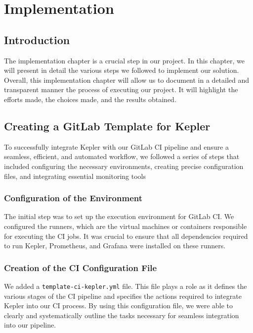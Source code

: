 \chapter{Implementation}
\label{chap:Chapter 4 title}
\section{Introduction}

The implementation chapter is a crucial step in our project. In this chapter, we will present in detail the various steps we followed to implement our solution. Overall, this implementation chapter will allow us to document in a detailed and transparent manner the process of executing our project. It will highlight the efforts made, the choices made, and the results obtained.

\pagebreak

\section{Creating a GitLab Template for Kepler}

To successfully integrate Kepler with our GitLab CI pipeline and ensure a seamless, efficient, and automated workflow, we followed a series of steps that included configuring the necessary environments, creating precise configuration files, and integrating essential monitoring tools
\subsection*{Configuration of the Environment}

The initial step was to set up the execution environment for GitLab CI. We configured the runners, which are the virtual machines or containers responsible for executing the CI jobs. It was crucial to ensure that all dependencies required to run Kepler, Prometheus, and Grafana were installed on these runners.

\subsection*{Creation of the CI Configuration File}

We added a \texttt{template-ci-kepler.yml} file. This file plays a 
role as it defines the various stages of the CI pipeline and specifies the actions required to integrate Kepler into our CI process. By using this configuration file, we were able to clearly and systematically outline the tasks necessary for seamless integration into our pipeline.

